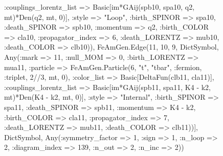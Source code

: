 \documentclass{revtex4}
\begin{document}
\begin{figure}[!htb]
\begin{center}
{:couplings_lorentz_list => Basic[im*GAij(spb10, spa10, q2, mt)*Den(q2, mt, 0)], :style => "Loop", :birth_SPINOR => spa10, :death_SPINOR => spb10, :momentum => q2, :birth_COLOR => cla10, :propagator_index => 6, :death_LORENTZ => mub10, :death_COLOR => clb10)), FeAmGen.Edge(11, 10, 9, Dict{Symbol, Any}(:mark => 11, :null_MOM => 0, :birth_LORENTZ => mua11, :particle => FeAmGen.Particle(6, "t", "tbar", :fermion, :triplet, 2//3, mt, 0), :color_list => Basic[DeltaFun(clb11, cla11)], :couplings_lorentz_list => Basic[im*GAij(spb11, spa11, K4 - k2, mt)*Den(K4 - k2, mt, 0)], :style => "Internal", :birth_SPINOR => spa11, :death_SPINOR => spb11, :momentum => K4 - k2, :birth_COLOR => cla11, :propagator_index => 7, :death_LORENTZ => mub11, :death_COLOR => clb11))], Dict{Symbol, Any}(:symmetry_factor => 1, :sign => 1, :n_loop => 2, :diagram_index => 139, :n_out => 2, :n_inc => 2)) 
}
\end{center}
\end{figure}
\end{document}
